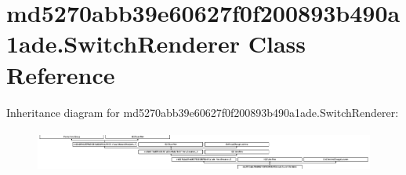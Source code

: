 \hypertarget{classmd5270abb39e60627f0f200893b490a1ade_1_1SwitchRenderer}{}\section{md5270abb39e60627f0f200893b490a1ade.\+Switch\+Renderer Class Reference}
\label{classmd5270abb39e60627f0f200893b490a1ade_1_1SwitchRenderer}
Inheritance diagram for md5270abb39e60627f0f200893b490a1ade.\+Switch\+Renderer\+:\begin{figure}[H]
\begin{center}
\leavevmode
\includegraphics[height=1.403509cm]{classmd5270abb39e60627f0f200893b490a1ade_1_1SwitchRenderer}
\end{center}
\end{figure}
